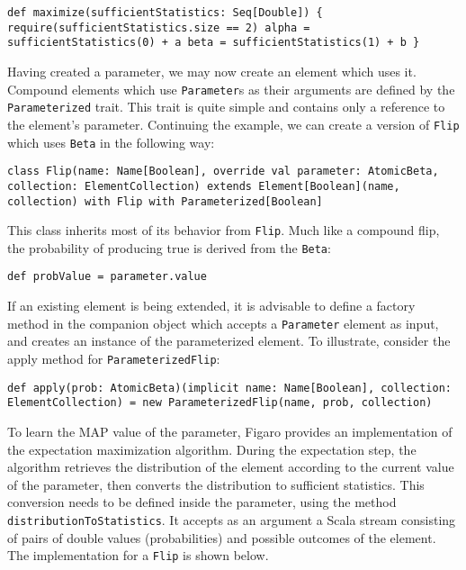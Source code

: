 \begin{flushleft}
\texttt{def maximize(sufficientStatistics: Seq[Double]) \{
\newline \tab require(sufficientStatistics.size == 2)
\newline \tab alpha = sufficientStatistics(0) + a
\newline \tab beta = sufficientStatistics(1) + b
\newline \}
}
\end{flushleft}

Having created a parameter, we may now create an element which uses it. Compound elements which use \texttt{Parameter}s as their arguments are defined by the \texttt{Parameterized} trait. This trait is quite simple and contains only a reference to the element's parameter. Continuing the example, we can create a version of \texttt{Flip} which uses \texttt{Beta} in the following way:

\begin{flushleft}
\texttt{class Flip(name: Name[Boolean], override val parameter: AtomicBeta, collection: ElementCollection)
\newline extends Element[Boolean](name, collection) with Flip 
\newline with Parameterized[Boolean]
}
\end{flushleft}

This class inherits most of its behavior from \texttt{Flip}. Much like a compound flip, the probability of producing true is derived from the \texttt{Beta}:

\begin{flushleft}
\texttt{def probValue = parameter.value}
\end{flushleft}

If an existing element is being extended, it is advisable to define a factory method in the companion object which accepts a \texttt{Parameter} element as input, and creates an instance of the parameterized element. To illustrate, consider the apply method for \texttt{ParameterizedFlip}:

\begin{flushleft}
\texttt{def apply(prob: AtomicBeta)(implicit name: Name[Boolean], collection: ElementCollection) =
\newline \tab new ParameterizedFlip(name, prob, collection)
}
\end{flushleft}

To learn the MAP value of the parameter, Figaro provides an implementation of the expectation maximization algorithm. During the expectation step, the algorithm retrieves the distribution of the element according to the current value of the parameter, then converts the distribution to sufficient statistics. This conversion needs to be defined inside the parameter, using the method \texttt{distributionToStatistics}. It accepts as an argument a Scala stream consisting of pairs of double values (probabilities) and possible outcomes of the element. The implementation for a \texttt{Flip} is shown below. 

